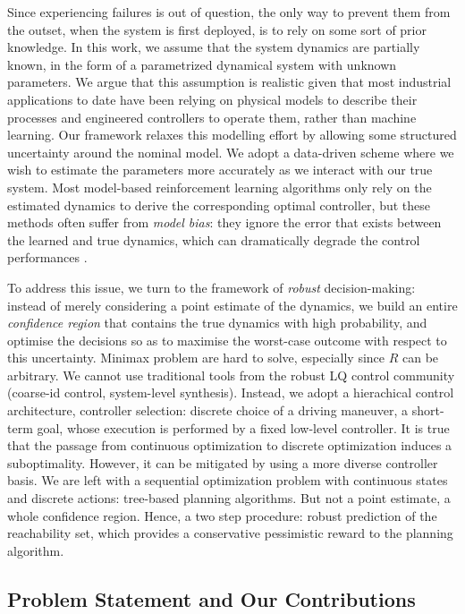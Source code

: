 \documentclass{article}
\begin{document}
Since experiencing failures is out of question, the only way to prevent them from the outset, when the system is first deployed, is to rely on some sort of prior knowledge. In this work, we assume that the system dynamics are partially known, in the form of a parametrized dynamical system with unknown parameters. We argue that this assumption is realistic given that most industrial applications to date have been relying on physical models to describe their processes and engineered controllers to operate them, rather than machine learning. Our framework relaxes this modelling effort by allowing some structured uncertainty around the nominal model. We adopt a data-driven scheme where we wish to estimate the parameters more accurately as we interact with our true system. Most model-based reinforcement learning algorithms only rely on the estimated dynamics to derive the corresponding optimal controller, but these methods often suffer from \emph{model bias}: they ignore the error that exists between the learned and true dynamics, which can dramatically degrade the control performances \citep{Schneider1997}.

To address this issue, we turn to the framework of \emph{robust} decision-making: instead of merely considering a point estimate of the dynamics, we build an entire \emph{confidence region} that contains the true dynamics with high probability, and optimise the decisions so as to maximise the worst-case outcome with respect to this uncertainty. Minimax problem are hard to solve, especially since $R$ can be arbitrary. We cannot use traditional tools from the robust LQ control community (coarse-id control, system-level synthesis). Instead, we adopt a hierachical control architecture, controller selection: discrete choice of a driving maneuver, a short-term goal, whose execution is performed by a fixed low-level controller. It is true that the passage from continuous optimization to discrete optimization induces a suboptimality. However, it can be mitigated by using a more diverse controller basis. We are left with a sequential optimization problem with continuous states and discrete actions: tree-based planning algorithms. But not a point estimate, a whole confidence region. Hence, a two step procedure: robust prediction of the reachability set, which provides a conservative pessimistic reward to the planning algorithm.


\subsection{Problem Statement and Our Contributions}
\end{document}
